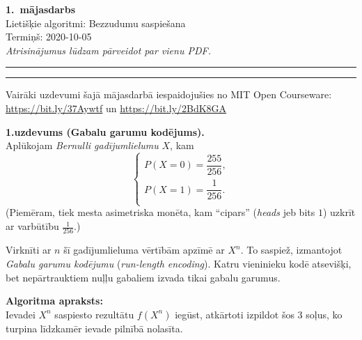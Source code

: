 \documentclass[a4paper,12pt]{article}
\begin{document}
\thispagestyle{empty}

\begin{center}
{\bf\Huge 1.\ mājasdarbs} \\[5pt]
Lietišķie algoritmi: Bezzudumu saspiešana \\
Termiņš: 2020-10-05\\[5pt]
{\em Atrisinājumus lūdzam pārveidot par vienu PDF.}
\end{center}

\hrule
\vspace{2pt}
\hrule
\vspace{12pt}



{\footnotesize
Vairāki uzdevumi šajā mājasdarbā iespaidojušies no MIT Open Courseware:
\url{https://bit.ly/37Aywtf} un \url{https://bit.ly/2BdK8GA}\\
}


\vspace{10pt}
{\bf 1.uzdevums (Gabalu garumu kodējums).}\\
Aplūkojam {\em Bernulli gadījumlielumu} $X$, kam
$$\left\{
\begin{array}{l}
P(X = 0) = \dfrac{255}{256},\\[6pt]
P(X = 1) = \dfrac{1}{256}.\\
\end{array} \right.$$
(Piemēram, tiek mesta asi\-met\-ris\-ka monēta, kam ``cipars''
({\em heads} jeb bits $1$) uzkrīt ar varbūtību $\frac{1}{256}$.)

Virknīti ar $n$ šī gadījumlieluma vērtībām ap\-zī\-mē ar $X^n$.
To saspiež, izmantojot {\em Gabalu garumu ko\-dē\-ju\-mu} ({\em run-length encoding}).
Katru vieninieku kodē atsevišķi, bet
nepārtrauktiem nuļļu gabaliem izvada tikai gabalu garumus.

{\bf Algoritma apraksts:}\\
Ievadei $X^n$ saspiesto rezultātu $f(X^n)$ iegūst,
atkārtoti izpildot šos 3 soļus, ko turpina līdzkamēr
ievade pilnībā nolasīta.
\end{document}
